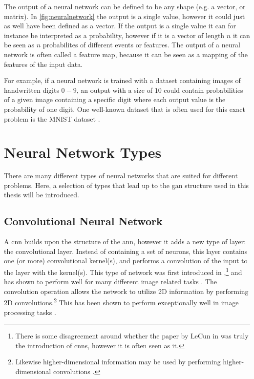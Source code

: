 The output of a neural network can be defined to be any shape (e.g. a vector, or matrix). In \cref{fig:neuralnetwork} the output is a single value, however it could just as well have been defined as a vector. If the output is a single value it can for instance be interpreted as a probability, however if it is a vector of length $n$ it can be seen as $n$ probabilites of different events or features. The output of a neural network is often called a feature map, because it can be seen as a mapping of the features of the input data. 

For example, if a neural network is trained with a dataset containing images of handwritten digits $0-9$, an output with a size of $10$ could contain probabilities of a given image containing a specific digit where each output value is the probability of one digit. One well-known dataset that is often used for this exact problem is the MNIST dataset \cite{mnist}.


\section{Neural Network Types}
There are many different types of neural networks that are suited for different problems. Here, a selection of types that lead up to the \gls{gan} structure used in this thesis will be introduced. 

\subsection{Convolutional Neural Network}
A \gls{cnn} builds upon the structure of the \gls{ann}, however it adds a new type of layer: the convolutional layer. Instead of containing a set of neurons, this layer contains one (or more) convolutional kernel(s), and performs a convolution of the input to the layer with the kernel(s). This type of network was first introduced in \citeyear{lecun1999object},\footnote{There is some disagreement around whether the paper by LeCun in \citeyear{lecun1999object} \cite{lecun1999object} was truly the introduction of \gls{cnn}s, however it is often seen as it. } and has shown to perform well for many different image related tasks \cite{lecun1999object,alexnet}. The convolution operation allows the network to utilize 2D information by performing 2D convolutions.\footnote{Likewise higher-dimensional information may be used by performing higher-dimensional convolutions \cite{8353466}. } This has been shown to perform exceptionally well in image processing tasks \cite{alexnet,oshea2015introduction}.

